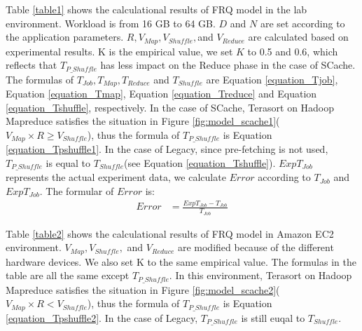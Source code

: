 {Table \ref{table1} shows the calculational results of FRQ model in the lab environment. Workload is from 16 GB to 64 GB. \(D\) and \(N\) are set according to the application parameters. \(R, V_{Map}, V_{Shuffle},\)and \(V_{Reduce}\) are calculated based on experimental results. K is the empirical value, we set \(K\) to 0.5 and 0.6, which reflects that \(T_{P\_Shuffle}\) has less impact on the Reduce phase in the case of SCache. The formulas of \(T_{Job}, T_{Map}, T_{Reduce}\) and \(T_{Shuffle}\) are Equation \ref{equation_Tjob}, Equation \ref{equation_Tmap}, Equation \ref{equation_Treduce} and Equation \ref{equation_Tshuffle}, respectively. In the case of SCache, Terasort on Hadoop Mapreduce satisfies the situation in Figure \ref{fig:model_scache1}(\(V_{Map} \times R \ge V_{Shuffle}\)), thus the formula of \(T_{P\_Shuffle}\) is Equation \ref{equation_Tpshuffle1}. In the case of Legacy, since pre-fetching is not used, \(T_{P\_Shuffle}\) is equal to \(T_{Shuffle}\)(see Equation \ref{equation_Tshuffle}). \(ExpT_{Job}\) represents the actual experiment data, we calculate \(Error\) according to \(T_{Job}\) and \(ExpT_{Job}\). The formular of \(Error\) is:
\begin{equation}
	\label{equation_error}
	\begin{aligned}
		Error &= \frac{ExpT_{Job} - T_{Job}}{T_{Job}}
	\end{aligned}
\end{equation}

Table \ref{table2} shows the calculational results of FRQ model in Amazon EC2 environment. \(V_{Map}, V_{Shuffle},\) and \(V_{Reduce}\) are modified because of the different hardware devices. We also set K to the same empirical value. The formulas in the table are all the same except \(T_{P\_Shuffle}\). In this environment, Terasort on Hadoop Mapreduce satisfies the situation in Figure \ref{fig:model_scache2}(\(V_{Map} \times R < V_{Shuffle}\)), thus the formula of \(T_{P\_Shuffle}\) is Equation \ref{equation_Tpshuffle2}. In the case of Legacy, \(T_{P\_Shuffle}\) is still euqal to \(T_{Shuffle}\).

}
